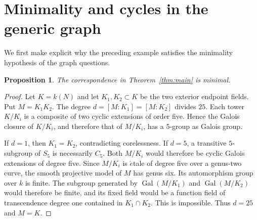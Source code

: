 \documentclass[11pt,a4paper,reqno]{amsart}
\newtheorem{proposition}[theorem]{Proposition}
\newcommand{\Gal}{\operatorname{Gal}}
\begin{document}
\section{Minimality and cycles in the generic graph}\label{sec:graph}
We first make explicit why the preceding example satisfies the
minimality hypothesis of the graph questions.

\begin{proposition}\label{prop:minimal}
The correspondence in Theorem~\ref{thm:main} is minimal.
\end{proposition}
\begin{proof}
Let $K=k(N)$ and let $K_1,K_2\subset K$ be the two exterior
endpoint fields. Put $M=K_1K_2$. The degree
$d=[M:K_1]=[M:K_2]$ divides $25$.
Each tower $K/K_i$ is a composite of two cyclic extensions of
order five. Hence the Galois closure of $K/K_i$, and therefore that
of $M/K_i$, has a $5$-group as Galois group.

If $d=1$, then $K_1=K_2$, contradicting corelessness.
If $d=5$, a transitive $5$-subgroup of $S_5$ is necessarily $C_5$.
Both $M/K_i$ would therefore be cyclic Galois extensions of degree
five. Since $M/K_i$ is \(\acute{e}\)tale of degree five over a
genus-two curve, the smooth projective model of $M$ has genus six.
Its automorphism group over $k$ is finite. The subgroup generated by
$\Gal(M/K_1)$ and $\Gal(M/K_2)$ would therefore be finite, and its
fixed field would be a function field of transcendence degree one
contained in $K_1\cap K_2$. This is impossible.
Thus $d=25$ and $M=K$.
\end{proof}
\end{document}
